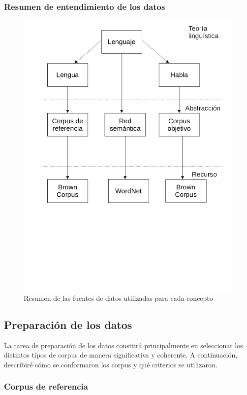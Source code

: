 \documentclass[12pt,letterpaper,twoside]{article}
\begin{document}
\subsubsection{Resumen de entendimiento de los datos}
\label{sec:orgd903100}
\begin{figure}[htbp]
\centering
\includegraphics[width=.9\linewidth]{./assets/entendimiento_de_los_datos.png}
\caption{Resumen de las fuentes de datos utilizadas para cada concepto}
\end{figure}


\subsection{Preparación de los datos}
\label{sec:org935a46b}
\label{sec:preparacion_datos}
La tarea de preparación de los datos consitirá principalmente en
seleccionar los distintos tipos de corpus de manera significativa
y coherente.  A continuación, describiré cómo se conformaron los
corpus y qué criterios se utilizaron.

\subsubsection{Corpus de referencia}
\label{sec:org5c1ebaa}
\end{document}
